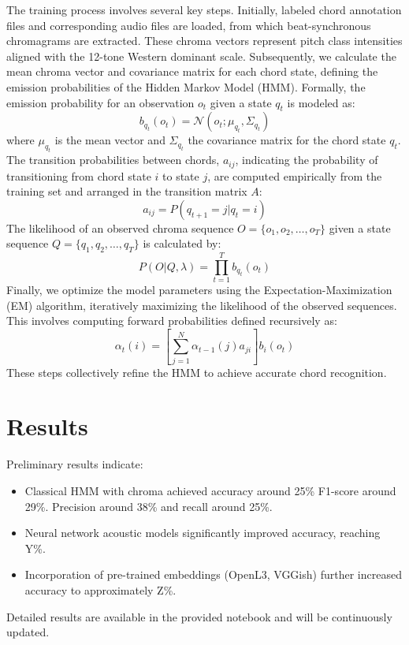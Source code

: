 \documentclass{article}
\begin{document}
The training process involves several key steps. Initially, labeled chord annotation files and corresponding audio files are loaded, from which beat-synchronous chromagrams are extracted. These chroma vectors represent pitch class intensities aligned with the 12-tone Western dominant scale. Subsequently, we calculate the mean chroma vector and covariance matrix for each chord state, defining the emission probabilities of the Hidden Markov Model (HMM). Formally, the emission probability for an observation $o_t$ given a state $q_t$ is modeled as:
\begin{equation}
b_{q_t}(o_t) = \mathcal{N}(o_t;\mu_{q_t}, \Sigma_{q_t})
\end{equation}
where $\mu_{q_t}$ is the mean vector and $\Sigma_{q_t}$ the covariance matrix for the chord state $q_t$. The transition probabilities between chords, $a_{ij}$, indicating the probability of transitioning from chord state $i$ to state $j$, are computed empirically from the training set and arranged in the transition matrix $A$:
\begin{equation}
a_{ij} = P(q_{t+1}=j|q_t=i)
\end{equation}
The likelihood of an observed chroma sequence $O = \{o_1, o_2, \dots, o_T\}$ given a state sequence $Q = \{q_1, q_2, \dots, q_T\}$ is calculated by:
\begin{equation}
P(O|Q,\lambda) = \prod_{t=1}^{T} b_{q_t}(o_t)
\end{equation}
Finally, we optimize the model parameters using the Expectation-Maximization (EM) algorithm, iteratively maximizing the likelihood of the observed sequences. This involves computing forward probabilities defined recursively as:
\begin{equation}
\alpha_t(i) = \left[\sum_{j=1}^{N}\alpha_{t-1}(j)a_{ji}\right] b_i(o_t)
\end{equation}
These steps collectively refine the HMM to achieve accurate chord recognition.



\section{Results}
Preliminary results indicate:
\begin{itemize}
    \item Classical HMM with chroma achieved accuracy around 25\% F1-score around 29\%. Precision around 38\% and recall around 25\%.
    \item Neural network acoustic models significantly improved accuracy, reaching Y\%.
    \item Incorporation of pre-trained embeddings (OpenL3, VGGish) further increased accuracy to approximately Z\%.
\end{itemize}
Detailed results are available in the provided notebook and will be continuously updated.
\end{document}

